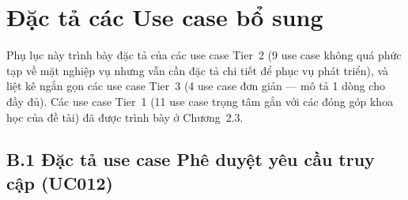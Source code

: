 \documentclass[../DoAn]{subfiles}
\begin{document}

\section*{Đặc tả các Use case bổ sung}

Phụ lục này trình bày đặc tả của các use case Tier~2 (9 use case không quá phức tạp về mặt nghiệp vụ nhưng vẫn cần đặc tả chi tiết để phục vụ phát triển), và liệt kê ngắn gọn các use case Tier~3 (4 use case đơn giản --- mô tả 1 dòng cho đầy đủ). Các use case Tier~1 (11 use case trọng tâm gắn với các đóng góp khoa học của đề tài) đã được trình bày ở Chương~2.3.

\subsection*{B.1 Đặc tả use case Phê duyệt yêu cầu truy cập (UC012)}
\end{document}
